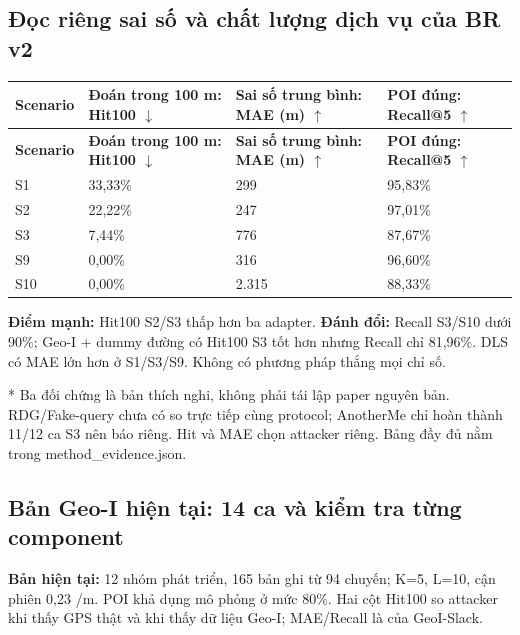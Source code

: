 \subsection{Đọc riêng sai số và chất lượng dịch vụ của BR v2}
\begingroup\small
\begin{longtable}{@{}P{1.936cm}P{4.646cm}P{4.936cm}P{4.839cm}@{}}
\toprule
\textbf{Scenario} & \textbf{Đoán trong 100 m: Hit100 $\downarrow$} & \textbf{Sai số trung bình: MAE (m) $\uparrow$} & \textbf{POI đúng: Recall@5 $\uparrow$}\\\midrule
\endfirsthead
\toprule
\textbf{Scenario} & \textbf{Đoán trong 100 m: Hit100 $\downarrow$} & \textbf{Sai số trung bình: MAE (m) $\uparrow$} & \textbf{POI đúng: Recall@5 $\uparrow$}\\\midrule
\endhead
\bottomrule\endfoot
S1 & 33,33\% & 299 & 95,83\%\\
\addlinespace[3pt]
S2 & 22,22\% & 247 & 97,01\%\\
\addlinespace[3pt]
S3 & 7,44\% & 776 & 87,67\%\\
\addlinespace[3pt]
S9 & 0,00\% & 316 & 96,60\%\\
\addlinespace[3pt]
S10 & 0,00\% & 2.315 & 88,33\%\\
\end{longtable}
\endgroup
{}

\textbf{Điểm mạnh:} Hit100 S2/S3 thấp hơn ba adapter. \textbf{Đánh đổi:} Recall S3/S10 dưới 90\%; Geo-I + dummy đường có Hit100 S3 tốt hơn nhưng Recall chỉ 81,96\%. DLS có MAE lớn hơn ở S1/S3/S9. Không có phương pháp thắng mọi chỉ số.

* Ba đối chứng là bản thích nghi, không phải tái lập paper nguyên bản. RDG/Fake-query chưa có so trực tiếp cùng protocol; AnotherMe chỉ hoàn thành 11/12 ca S3 nên báo riêng. Hit và MAE chọn attacker riêng. Bảng đầy đủ nằm trong method\_\allowbreak{}evidence.json.


\clearpage
\subsection{Bản Geo-I hiện tại: 14 ca và kiểm tra từng component}
\textbf{Bản hiện tại:} 12 nhóm phát triển, 165 bản ghi từ 94 chuyến; K=5, L=10, cận phiên 0,23 /m. POI khả dụng mô phỏng ở mức 80\%. Hai cột Hit100 so attacker khi thấy GPS thật và khi thấy dữ liệu Geo-I; MAE/Recall là của GeoI-Slack.

